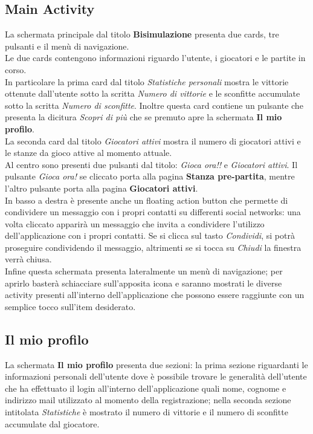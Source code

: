 \documentclass[a4paper,12pt,twoside,openright]{report}
\begin{document}
\subsection{Main Activity}
La schermata principale dal titolo \textbf{Bisimulazione} presenta due cards, tre pulsanti e il menù di navigazione.\\
Le due cards contengono informazioni riguardo l'utente, i giocatori e le partite in corso.\\ 
In particolare la prima card dal titolo \textit{Statistiche personali}  mostra le vittorie ottenute dall'utente sotto la scritta \textit{Numero di vittorie} e le sconfitte 
accumulate sotto la scritta \textit{Numero di sconfitte}. Inoltre questa card contiene un pulsante che presenta la dicitura \textit{Scopri di più} che se premuto apre la
schermata \textbf{Il mio profilo}.\\
La seconda card dal titolo \textit{Giocatori attivi} mostra il numero di giocatori attivi e le stanze da gioco attive al momento attuale.\\
Al centro sono presenti due pulsanti dal titolo: \textit{Gioca ora!!} e \textit{Giocatori attivi}. Il pulsante \textit{Gioca ora!} se cliccato porta alla pagina
\textbf{Stanza pre-partita}, mentre l'altro pulsante porta alla pagina \textbf{Giocatori attivi}.\\
In basso a destra è presente anche un floating action button che permette di condividere un messaggio con i propri contatti su differenti social networks: una volta cliccato
apparirà un messaggio che invita a condividere l'utilizzo dell'applicazione con i propri contatti. Se si clicca sul tasto \textit{Condividi}, si potrà proseguire condividendo
il messaggio, altrimenti se si tocca su \textit{Chiudi} la finestra verrà chiusa.\\
Infine questa schermata presenta lateralmente un menù di navigazione; per aprirlo basterà schiacciare sull'apposita icona e saranno mostrati le diverse activity
presenti all'interno dell'applicazione che possono essere raggiunte con un semplice tocco sull'item desiderato.

\subsection{Il mio profilo}
La schermata \textbf{Il mio profilo} presenta due sezioni: la prima sezione riguardanti le informazioni personali dell'utente dove è possibile trovare le generalità dell'utente
 che ha effettuato il login all'interno dell'applicazione quali nome, cognome e indirizzo mail utilizzato al momento della registrazione; nella seconda sezione intitolata \textit{Statistiche}
è mostrato il numero di vittorie e il numero di sconfitte accumulate dal giocatore.
\end{document}

